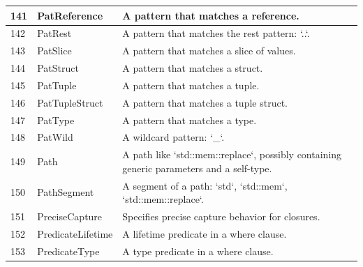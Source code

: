 \begin{longtable}{| p{} | p{} | p{} |}
141   & PatReference                   & A pattern that matches a reference.                                                                            \\ \hline
142   & PatRest                        & A pattern that matches the rest pattern: `..`.                                                                 \\ \hline
143   & PatSlice                       & A pattern that matches a slice of values.                                                                      \\ \hline
144   & PatStruct                      & A pattern that matches a struct.                                                                               \\ \hline
145   & PatTuple                       & A pattern that matches a tuple.                                                                                \\ \hline
146   & PatTupleStruct                 & A pattern that matches a tuple struct.                                                                         \\ \hline
147   & PatType                        & A pattern that matches a type.                                                                                 \\ \hline
148   & PatWild                        & A wildcard pattern: `\_`.                                                                                       \\ \hline
149   & Path                           & A path like `std::mem::replace`, possibly containing generic parameters and a self-type.                       \\ \hline
150   & PathSegment                    & A segment of a path: `std`, `std::mem`, `std::mem::replace`.                                                   \\ \hline
151   & PreciseCapture                 & Specifies precise capture behavior for closures.                                                               \\ \hline
152   & PredicateLifetime              & A lifetime predicate in a where clause.                                                                        \\ \hline
153   & PredicateType                  & A type predicate in a where clause.                                                                            \\ \hline

\end{longtable}
